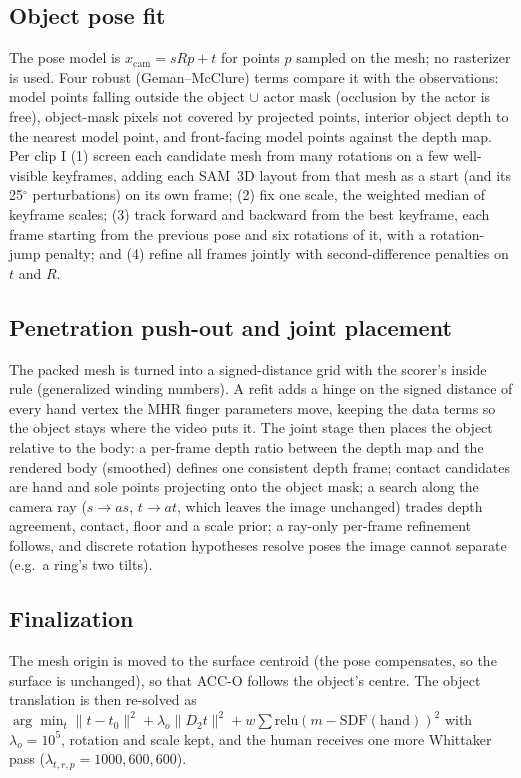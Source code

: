 \documentclass[10pt,twocolumn]{article}
\begin{document}
\subsection{Object pose fit}
The pose model is $x_\text{cam} = s R p + t$ for points $p$ sampled on the mesh; no rasterizer is used. Four robust
(Geman--McClure) terms compare it with the observations: model points falling outside the object $\cup$ actor
mask (occlusion by the actor is free), object-mask pixels not covered by projected points, interior object depth
to the nearest model point, and front-facing model points against the depth map. Per clip I (1) screen each
candidate mesh from many rotations on a few well-visible keyframes, adding each SAM~3D layout from that mesh as a
start (and its 25$^\circ$ perturbations) on its own frame; (2) fix one scale, the weighted median of keyframe
scales; (3) track forward and backward from the best keyframe, each frame starting from the previous pose and six
rotations of it, with a rotation-jump penalty; and (4) refine all frames jointly with second-difference
penalties on $t$ and $R$.

\subsection{Penetration push-out and joint placement}
The packed mesh is turned into a signed-distance grid with the scorer's inside rule (generalized winding numbers).
A refit adds a hinge on the signed distance of every hand vertex the MHR finger parameters move, keeping the data
terms so the object stays where the video puts it. The joint stage then places the object relative to the body:
a per-frame depth ratio between the depth map and the rendered body (smoothed) defines one consistent depth
frame; contact candidates are hand and sole points projecting onto the object mask; a search along the camera
ray ($s \to a s$, $t \to a t$, which leaves the image unchanged) trades depth agreement, contact, floor and a
scale prior; a ray-only per-frame refinement follows, and discrete rotation hypotheses resolve poses the image
cannot separate (e.g.\ a ring's two tilts).

\subsection{Finalization}
The mesh origin is moved to the surface centroid (the pose compensates, so the surface is unchanged), so that
ACC-O follows the object's centre. The object translation is then re-solved as
$\arg\min_t \|t - t_0\|^2 + \lambda_o \|D_2 t\|^2 + w \sum \mathrm{relu}(m - \mathrm{SDF}(\text{hand}))^2$ with
$\lambda_o = 10^5$, rotation and scale kept, and the human receives one more Whittaker pass
($\lambda_{t,r,p} = 1000, 600, 600$).
\end{document}
